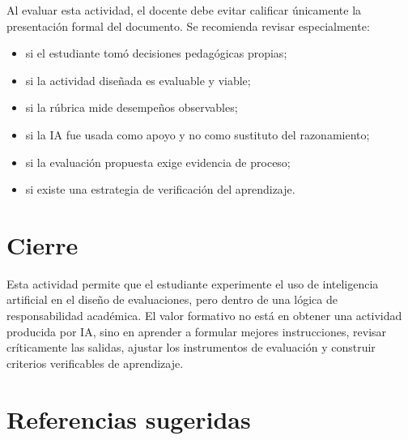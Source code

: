 \documentclass[12pt,letterpaper]{article}
\begin{document}
Al evaluar esta actividad, el docente debe evitar calificar
únicamente la presentación formal del documento. Se recomienda
revisar especialmente:

\begin{itemize}
  \item si el estudiante tomó decisiones pedagógicas propias;
  \item si la actividad diseñada es evaluable y viable;
  \item si la rúbrica mide desempeños observables;
  \item si la IA fue usada como apoyo y no como sustituto del razonamiento;
  \item si la evaluación propuesta exige evidencia de proceso;
  \item si existe una estrategia de verificación del aprendizaje.
\end{itemize}

\section{Cierre}

Esta actividad permite que el estudiante experimente el uso de
inteligencia artificial en el diseño de evaluaciones, pero dentro de
una lógica de responsabilidad académica. El valor formativo no está
en obtener una actividad producida por IA, sino en aprender a
formular mejores instrucciones, revisar críticamente las salidas,
ajustar los instrumentos de evaluación y construir criterios
verificables de aprendizaje.

\section*{Referencias sugeridas}
\end{document}
